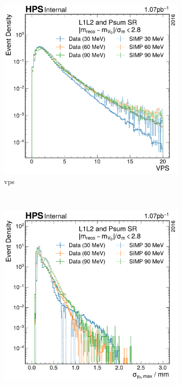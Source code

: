 \begin{figure}
  \centering
  \begin{subfigure}{0.30\textwidth}
    \includegraphics[width=\textwidth]{figures/hps/analysis/vtx_proj_sig-distribution.pdf}
    \caption{\ac{vps}}
    \label{fig:data-signal-comp:vps}
  \end{subfigure}
  ~
  \begin{subfigure}{0.30\textwidth}
    \includegraphics[width=\textwidth]{figures/hps/analysis/max_y0_err-distribution.pdf}

\end{subfigure}
\end{figure}
